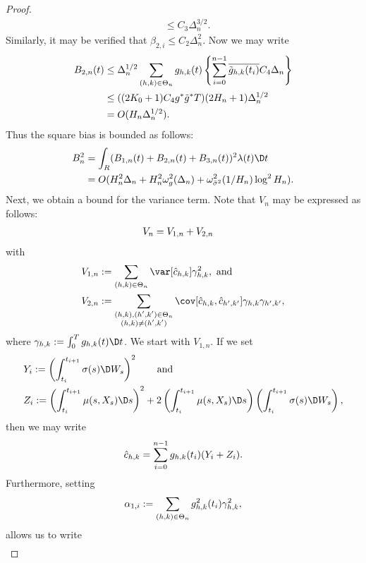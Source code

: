 \begin{appendices}
\begin{proof}
\begin{align}
& \le C_3 \Delta_n^{3/2}.
  \label{}
\end{align}
Similarly, it may be verified that $\beta_{2,i} \le C_2 \Delta_n^2$. Now we may write
\begin{align}
  B_{2,n}(t) &\le \Delta_n^{1/2}\sum_{(h,k) \in \Theta_n} g_{h,k}(t)\left\{ \sum_{i=0}^{n-1} \overline{\tilde{g}_{h,k}(t_i)} C_4 \Delta_n \right\} \notag \\
  & \le ( (2K_0+1)C_4 g^*\tilde{g}^* T) (2H_n + 1)\Delta^{1/2}_n\notag\\
  & = O(H_n \Delta^{1/2}_n).
  \label{}
\end{align}
Thus the square bias is bounded as follows:
\begin{align}
  B^2_n &= \int_R (B_{1,n}(t) + B_{2,n}(t)+  B_{3,n}(t))^2 \lambda(t) \D t \notag\\
  &= O(H_n^2 \Delta_n + H^2_n\omega^2_g(\Delta_n)  + \omega^2_{\bsv}(1/H_n)\log^2H_n).
  \label{}
\end{align}
Next, we obtain a  bound for the variance term. Note that $V_n$ may be expressed as follows:
\begin{align}
  V_n & = V_{1,n} + V_{2,n} \notag
\end{align}
with
\begin{align}
  & V_{1,n} := \sum_{(h,k) \in \Theta_n}\var[\cnhk]\gamma_{h,k}^2,\text{ and} \notag\\ 
& V_{2,n} := \mathop{\sum}_{\substack{(h,k),(h',k') \in \Theta_n\\(h,k) \ne (h',k')}} \cov[\cnhk, \hat{c}_{h',k'}] \gamma_{h,k} \gamma_{h',k'},\notag
  \label{}
\end{align}
where $\gamma_{h,k} : = \int_0^T g_{h,k}(t) \D t$.  We start with $V_{1,n}$. If we set 
\begin{align}
  &Y_i := \left(\int^{t_{i+1}}_{t_i} \sigma(s) \D W_s\right)^2  \qquad \text{and} \notag\\
  &Z_i := \left(\int^{t_{i+1}}_{t_i} \mu(s, X_s) \D s\right)^2 + 2\left(\int^{t_{i+1}}_{t_i} \mu(s,X_s) \D s\right)\left(\int^{t_{i+1}}_{t_i} \sigma(s) \D W_s\right), \notag 
  \label{}
\end{align}
then we may write 
\begin{align}
  \hat{c}_{h,k} = \sum_{i = 0}^{n-1} g_{h,k}(t_i) (Y_i + Z_i).\notag
  \label{}
\end{align}
Furthermore, setting
\begin{align}
  \alpha_{1,i} := \sum_{(h,k) \in \Theta_n} g^2_{h,k}(t_i)\gamma_{h,k}^2,\notag
  \label{}
\end{align}
allows us to write 
\begin{align}

\end{align}
\end{proof}
\end{appendices}
